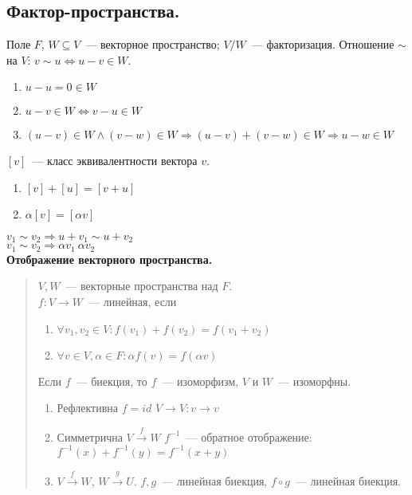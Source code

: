 \documentclass[12pt]{article}
\begin{document}
	\subsection{Фактор-пространства.}
	\begin{definition}
		Поле $F$, $W \subseteq V$~--- векторное пространство; $V / W$~--- факторизация. Отношение $\sim$ на $V$: $v \sim u \Leftrightarrow u - v \in W$.
		\begin{enumerate}
			\item $u - u = 0 \in W$
			\item $u - v \in W \Leftrightarrow v - u \in W$
			\item $(u - v) \in W \wedge (v - w) \in W \Rightarrow (u - v) + (v - w) \in W \Rightarrow u - w \in W$
		\end{enumerate}
	\end{definition}
	\noindent
	$[v]$~--- класс эквивалентности вектора $v$.
	\begin{enumerate}
		\item $[v] + [u] = [v + u]$
		\item $\alpha [v] = [\alpha v]$
	\end{enumerate}
	$v_1 \sim v_2 \Rightarrow u + v_1 \sim u + v_2$ \\
	$v_1 \sim v_2 \Rightarrow \alpha v_1 ~ \alpha v_2$ \\
	\textbf{Отображение векторного пространства.}
	\begin{quote}
		$V, W$~--- векторные пространства над $F$. \\
		$f: V \rightarrow W$~--- линейная, если
		\begin{enumerate}
			\item $\forall v_1, v_2 \in V: f(v_1) + f(v_2) = f(v_1 + v_2)$
			\item $\forall v \in V, \alpha \in F: \alpha f(v) = f(\alpha v)$
		\end{enumerate}
		Если $f$~--- биекция, то $f$~--- изоморфизм, $V$ и $W$~--- изоморфны.
		\begin{enumerate}
			\item Рефлективна $f = id$ $V \rightarrow V: v \rightarrow v$
			\item Симметрична $V \xrightarrow{f} W$ $f^{-1}$~--- обратное отображение: $f^{-1}(x) + f^{-1}(y) = f^{-1}(x + y)$
			\item $V \xrightarrow{f} W$, $W \xrightarrow{g} U$. $f, g$~--- линейная биекция, $f \circ g$~--- линейная биекция.
		\end{enumerate}
	\end{quote}
\end{document}
